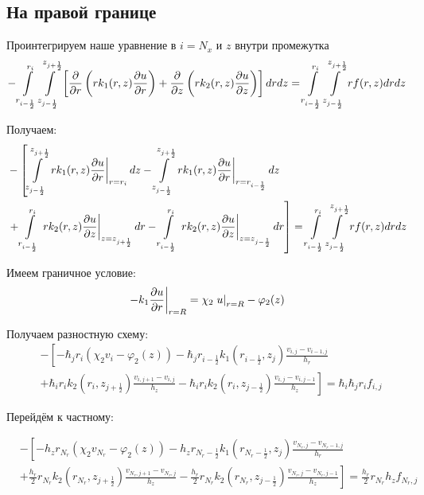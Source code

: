 \subsection{На правой границе}
Проинтегрируем наше уравнение в $ i = N_x $ и $ z $ внутри промежутка
\[
  - \mLim{}{-\frac{1}{2}}{+\frac{1}{2}}{-\frac{1}{2}} \left [ \pdv{}{r} \left ( r k_1(r, z) \pdv{u}{r} \right ) 
  + \pdv{}{z} \left ( rk_2(r, z)\pdv{u}{z} \right ) \right ]dr dz = \mLim{}{-\frac{1}{2}}{+\frac{1}{2}}{-\frac{1}{2}} rf(r, z)dr dz
\]

Получаем:
\begin{align*}
  &- \left [
   \mLimZ{z}{+\frac{1}{2}}{-\frac{1}{2}}{j}  \left . r k_1(r, z) \pdv{u}{r} \right \vert_{r = r_{i}} dz
  - \mLimZ{z}{+\frac{1}{2}}{-\frac{1}{2}}{j} \left . r k_1(r, z) \pdv{u}{r} \right \vert_{r = r_{i - \frac{1}{2}}} dz
  \right . \\
  &\left . + \mLimS{r}{}{-\frac{1}{2}} \left . rk_2(r, z)\pdv{u}{z} \right \vert_{z = z_{j + \frac{1}{2}}} dr
  - \mLimS{r}{}{-\frac{1}{2}} \left . rk_2(r, z)\pdv{u}{z} \right \vert_{z = z_{j - \frac{1}{2}}} dr
  \right ] = \mLim{}{-\frac{1}{2}}{+\frac{1}{2}}{-\frac{1}{2}} rf(r, z) dr dz
\end{align*}

Имеем граничное условие:
\[
  \left . -k_1 \pdv{u}{r} \right \vert_{r=R} = \chi_2 \left . u \right \vert_{r=R} - \varphi_2(z)
\]

Получаем разностную схему:
\begin{align*}
  &- \left [ 
  -\hbar_j r_i ( \chi_2 v_i - \varphi_2(z))
  - \hbar_j r_{i-\frac{1}{2}} k_1(r_{i-\frac{1}{2}}, z_j) \frac{v_{i, j} - v_{i - 1, j}}{h_{r}}
  \right . \\
  &\left .
  + \hbar_i r_{i} k_2(r_i, z_{j+\frac{1}{2}}) \frac{v_{i, j + 1} - v_{i, j}}{h_{z}}
  - \hbar_i r_{i} k_2(r_i, z_{j-\frac{1}{2}}) \frac{v_{i, j} - v_{i, j - 1}}{h_z}
  \right ]  = \hbar_i \hbar_j r_i f_{i, j}
\end{align*}

Перейдём к частному:

\begin{align*}
  &- \left [ 
  -h_z r_{N_r} ( \chi_2 v_{N_r} - \varphi_2(z))
  - h_z r_{N_r-\frac{1}{2}} k_1(r_{N_r-\frac{1}{2}}, z_j) \frac{v_{N_r, j} - v_{N_r - 1, j}}{h_{r}}
  \right . \\
  &\left .
  + \frac{h_r}{2} r_{N_r} k_2(r_{N_r}, z_{j+\frac{1}{2}}) \frac{v_{N_r, j + 1} - v_{N_r, j}}{h_{z}}
  - \frac{h_r}{2} r_{N_r} k_2(r_{N_r}, z_{j-\frac{1}{2}}) \frac{v_{N_r, j} - v_{N_r, j - 1}}{h_z}
  \right ]  = \frac{h_r}{2} r_{N_r} h_z f_{N_r, j}
\end{align*}

